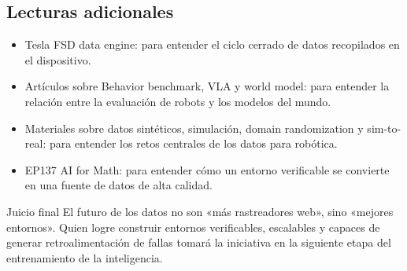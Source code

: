 \subsection{Lecturas adicionales}

\begin{itemize}
\item Tesla FSD data engine: para entender el ciclo cerrado de datos recopilados en el dispositivo.
\item Artículos sobre Behavior benchmark, VLA y world model: para entender la relación entre la evaluación de robots y los modelos del mundo.
\item Materiales sobre datos sintéticos, simulación, domain randomization y sim-to-real: para entender los retos centrales de los datos para robótica.
\item EP137 AI for Math: para entender cómo un entorno verificable se convierte en una fuente de datos de alta calidad.
\end{itemize}

\begin{importantbox}{Juicio final}
El futuro de los datos no son «más rastreadores web», sino «mejores entornos». Quien logre construir entornos verificables, escalables y capaces de generar retroalimentación de fallas tomará la iniciativa en la siguiente etapa del entrenamiento de la inteligencia.
\end{importantbox}


